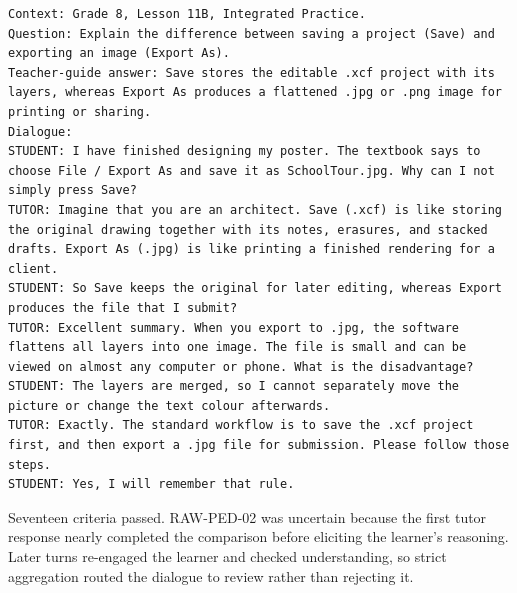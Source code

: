 \documentclass[conference]{IEEEtran}
\begin{document}
\begin{Verbatim}[breaklines=true,breakanywhere=true,fontsize=\footnotesize,formatcom=\rmfamily]
Context: Grade 8, Lesson 11B, Integrated Practice.
Question: Explain the difference between saving a project (Save) and exporting an image (Export As).
Teacher-guide answer: Save stores the editable .xcf project with its layers, whereas Export As produces a flattened .jpg or .png image for printing or sharing.
Dialogue:
STUDENT: I have finished designing my poster. The textbook says to choose File / Export As and save it as SchoolTour.jpg. Why can I not simply press Save?
TUTOR: Imagine that you are an architect. Save (.xcf) is like storing the original drawing together with its notes, erasures, and stacked drafts. Export As (.jpg) is like printing a finished rendering for a client.
STUDENT: So Save keeps the original for later editing, whereas Export produces the file that I submit?
TUTOR: Excellent summary. When you export to .jpg, the software flattens all layers into one image. The file is small and can be viewed on almost any computer or phone. What is the disadvantage?
STUDENT: The layers are merged, so I cannot separately move the picture or change the text colour afterwards.
TUTOR: Exactly. The standard workflow is to save the .xcf project first, and then export a .jpg file for submission. Please follow those steps.
STUDENT: Yes, I will remember that rule.
\end{Verbatim}
Seventeen criteria passed. RAW-PED-02 was uncertain because the first tutor response nearly completed the comparison before eliciting the learner's reasoning. Later turns re-engaged the learner and checked understanding, so strict aggregation routed the dialogue to review rather than rejecting it.
\end{document}
